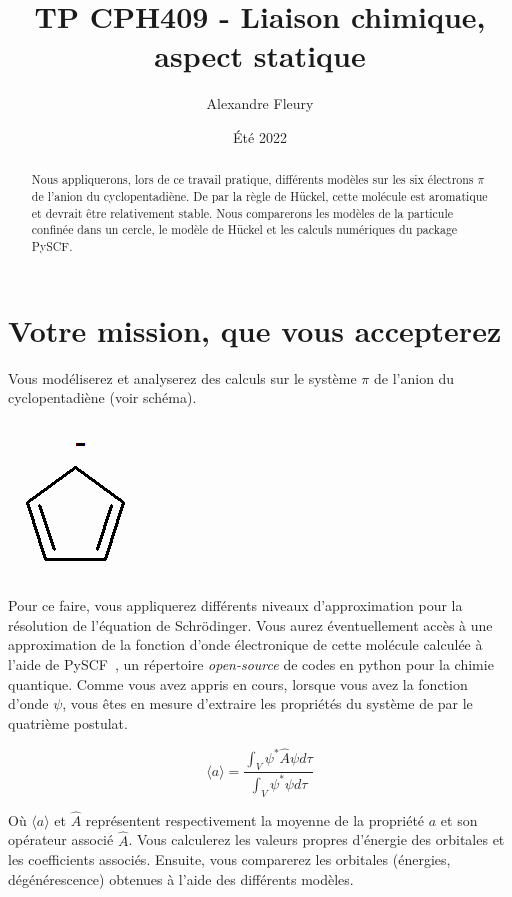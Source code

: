 \documentclass[12pt,letterpaper]{article}
\title{TP CPH409 - Liaison chimique, aspect statique}
\author{Alexandre Fleury}
\date{Été 2022}
\newenvironment{problematique}{
\renewcommand{\abstractname}{But}
\begin{abstract}
}{
\end{abstract}
}
\begin{document}
\renewcommand{\labelitemi}{$\bullet$}
\maketitle

\begin{problematique}
Nous appliquerons, lors de ce travail pratique, différents modèles sur les six électrons $\pi$ de l'anion du cyclopentadiène. De par la règle de Hückel, cette molécule est aromatique et devrait être relativement stable. Nous comparerons les modèles de la particule confinée dans un cercle, le modèle de Hückel et les calculs numériques du package PySCF.
\end{problematique}

\section*{Votre mission, que vous accepterez}
Vous modéliserez et analyserez des calculs sur le système $\pi$ de l'anion du cyclopentadiène (voir schéma).
\begin{center}
  \includegraphics[width=.1\linewidth]{clyclopentadiene_anion.png}
\end{center}

Pour ce faire, vous appliquerez différents niveaux d'approximation pour la résolution de l'équation de Schrödinger. Vous aurez éventuellement accès à une approximation de la fonction d'onde électronique de cette molécule calculée à l'aide de PySCF~\cite{pyscf}, un répertoire \textit{open-source} de codes en python pour la chimie quantique. Comme vous avez appris en cours, lorsque vous avez la fonction d'onde $\psi$, vous 
êtes en mesure d'extraire les propriétés du système de par le quatrième postulat.

\begin{equation*}
\langle a \rangle = \frac{\int_V \psi^* \hat{A} \psi d\tau}{\int_V \psi^* \psi d\tau}
\end{equation*}

Où $\langle a \rangle$ et $\hat{A}$ représentent respectivement la moyenne de la propriété $a$ et son opérateur associé $\hat{A}$. Vous calculerez les valeurs propres d'énergie des orbitales et les coefficients associés. Ensuite, vous comparerez les orbitales (énergies, dégénérescence) obtenues à l'aide des différents modèles.
\end{document}

